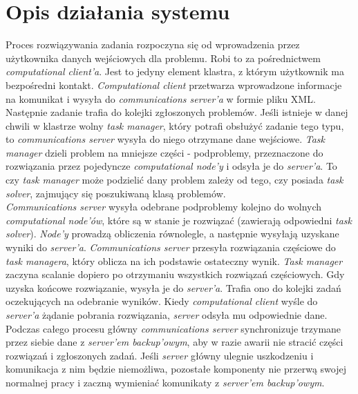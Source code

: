 \documentclass[12pt,a4paper,titlepage]{report}
\begin{document}
	\chapter{Opis działania systemu}
	Proces rozwiązywania zadania rozpoczyna się od wprowadzenia przez użytkownika danych wejściowych dla problemu. Robi to za pośrednictwem \emph{computational client'a}. Jest to jedyny element klastra, z którym użytkownik ma bezpośredni kontakt. \emph{Computational client} przetwarza wprowadzone informacje na komunikat i wysyła do \emph{communications server'a} w formie pliku XML.\\
	Następnie zadanie trafia do kolejki zgłoszonych problemów. Jeśli istnieje w danej chwili w klastrze wolny \emph{task manager}, który potrafi obsłużyć zadanie tego typu, to \emph{communications server} wysyła do niego otrzymane dane wejściowe. \emph{Task manager} dzieli problem na mniejsze części - podproblemy, przeznaczone do rozwiązania przez pojedyncze \emph{computational node'y} i odsyła je do \emph{server'a}. To czy \emph{task manager} może podzielić dany problem zależy od tego, czy posiada \emph{task solver}, zajmujący się poszukiwaną klasą problemów.\\
	\emph{Communications server} wysyła odebrane podproblemy kolejno do wolnych \emph{computational node'ów}, które są w stanie je rozwiązać (zawierają odpowiedni \emph{task solver}). \emph{Node'y} prowadzą obliczenia równolegle, a następnie wysyłają uzyskane wyniki do \emph{server'a}. \emph{Communications server} przesyła rozwiązania częściowe do \emph{task managera}, który oblicza na ich podstawie ostateczny wynik. \emph{Task manager} zaczyna scalanie dopiero po otrzymaniu wszystkich rozwiązań częściowych. Gdy uzyska końcowe rozwiązanie, wysyła je do \emph{server'a}. Trafia ono do kolejki zadań oczekujących na odebranie wyników. Kiedy \emph{computational client} wyśle do \emph{server'a} żądanie pobrania rozwiązania, \emph{server} odsyła mu odpowiednie dane.\\
Podczas całego procesu główny \emph{communications server} synchronizuje trzymane przez siebie dane z \emph{server'em backup'owym}, aby w razie awarii nie stracić części rozwiązań i zgłoszonych zadań. Jeśli \emph{server} główny ulegnie uszkodzeniu i komunikacja z nim będzie niemożliwa, pozostałe komponenty nie przerwą swojej normalnej pracy i zaczną wymieniać komunikaty z \emph{server'em backup'owym}.
\end{document}
